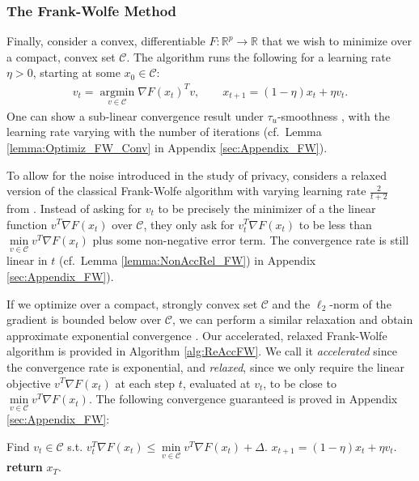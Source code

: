 \documentclass{article}
\begin{document}

\subsubsection{The Frank-Wolfe Method} \label{sec:The Frank-Wolfe Method}

Finally, consider a convex, differentiable $F : \mathbb{R}^p \rightarrow \mathbb{R}$ that we wish to minimize over a compact, convex set $\mathcal{C}$. The algorithm runs the following for a learning rate $\eta 
 > 0$, starting at some $x_0 \in \mathcal{C}$:
\begin{align}
\label{eq:FW_Rule}
v_t = \mathop{\arg \min}\limits_{v \in \mathcal{C}} \nabla F(x_t)^Tv, \qquad x_{t + 1} = (1 - \eta)x_t + \eta v_t.
\end{align}
One can show a sub-linear convergence result under $\tau_u$-smoothness \cite{Recht, FWS}, with the learning rate varying with the number of iterations (cf.\ Lemma \ref{lemma:Optimiz_FW_Conv} in Appendix \ref{sec:Appendix_FW}). 

To allow for the noise introduced in the study of privacy, \cite{NOPL} considers a relaxed version of the classical Frank-Wolfe algorithm with varying learning rate $\frac{2}{t + 2}$ from \cite{Rev_FW_Prof_Free_Jaggi}. Instead of asking for $v_t$ to be precisely the minimizer of a the linear function $v^T\nabla F(x_t)$ over $\mathcal{C}$, they only ask for $v_t^T\nabla F(x_t)$ to be less than $\mathop{\min}\limits_{v \in \mathcal{C}}v^T\nabla F(x_t)$ plus some non-negative error term. The convergence rate is still linear in $t$ (cf.\ Lemma \ref{lemma:NonAccRel_FW}) in Appendix \ref{sec:Appendix_FW}).

If we optimize over a compact, strongly convex set $\mathcal{C}$ and the $\ell_2$-norm of the gradient is bounded below over $\mathcal{C}$, we can perform a similar relaxation and obtain approximate exponential convergence \cite{ACCFW}. Our accelerated, relaxed Frank-Wolfe algorithm is provided in Algorithm \ref{alg:ReAccFW}. We call it \emph{accelerated} since the convergence rate is exponential, and \emph{relaxed}, since we only require the linear objective $v^T\nabla F(x_t)$ at each step $t$, evaluated at $v_t$, to be close to $\mathop{\min}\limits_{v \in \mathcal{C}}v^T\nabla F(x_t)$.
The following convergence guaranteed is proved in Appendix \ref{sec:Appendix_FW}:

\begin{algorithm}
\caption{Relaxed and Accelerated Frank-Wolfe}
\label{alg:ReAccFW}
\begin{algorithmic}[1]
        \State Find $v_t \in \mathcal{C}$ s.t. $v_t^T\nabla F(x_t) \leq \mathop{\min}\limits_{v \in \mathcal{C}}v^T\nabla F(x_t) + \Delta$.
        \State $x_{t + 1} = (1 - \eta)x_t + \eta v_t$.
    \EndFor
    \State \textbf{return} $x_T$.
\EndFunction
\end{algorithmic}
\end{algorithm}
\end{document}
